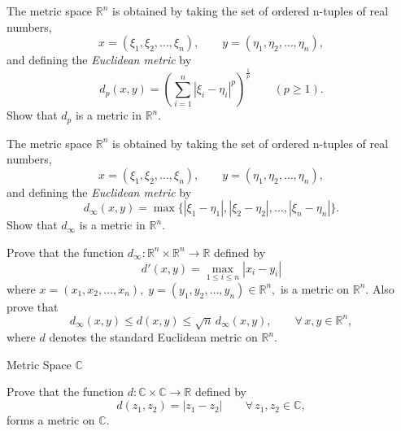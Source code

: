 \documentclass[12pt, a4paper]{article}
\begin{document}
\clearpage

\begin{theorem}
    The metric space $\mathbb{R}^n$ is obtained by taking the set of ordered n-tuples of
    real numbers,
    \[
    x=(\xi_1,\xi_2,\ldots,\xi_n), \qquad y=(\eta_1,\eta_2,\ldots,\eta_n),
    \]
    and defining the \emph{Euclidean metric} by
    \[
    d_p(x,y)=\left(\sum_{i=1}^{n}|\xi_i-\eta_i|^p\right)^{\frac{1}{p}} \qquad (p\ge 1).
    \]
    Show that $d_p$ is a metric in $\mathbb{R}^n$.
\end{theorem}

\clearpage

\begin{theorem}
    The metric space $\mathbb{R}^n$ is obtained by taking the set of ordered n-tuples of
    real numbers,
    \[
    x=(\xi_1,\xi_2,\ldots,\xi_n), \qquad y=(\eta_1,\eta_2,\ldots,\eta_n),
    \]
    and defining the \emph{Euclidean metric} by
    \[
    d_\infty(x,y)=\max\{|\xi_1-\eta_1|,|\xi_2-\eta_2|,\ldots,|\xi_n-\eta_n|\}.
    \]
    Show that $d_{\infty}$ is a metric in $\mathbb{R}^n$.
\end{theorem}

\clearpage

\begin{theorem}
Prove that the function $d_{\infty} : \mathbb{R}^n \times \mathbb{R}^n \to \mathbb{R}$
defined by
\[
d'(x,y)=\max_{1\le i\le n}|x_i-y_i|\]
where
\(x=(x_1,x_2,\dots,x_n),\;
y=(y_1,y_2,\dots,y_n)\in\mathbb{R}^n,
\)
is a metric on $\mathbb{R}^n$. Also prove that
\[
d_{\infty}(x,y)\le d(x,y)\le \sqrt{n}\,d_{\infty}(x,y),
\qquad \forall\, x,y\in\mathbb{R}^n,
\]
where $d$ denotes the standard Euclidean metric on $\mathbb{R}^n$.
\end{theorem}

\clearpage

\begin{heading}
    Metric Space $\mathbb{C}$
\end{heading}

\vspace{10pt}

\begin{theorem}
Prove that the function
\(
d : \mathbb{C} \times \mathbb{C} \to \mathbb{R}
\)
defined by
\[
d(z_1,z_2)=|z_1-z_2|
\qquad \forall\, z_1,z_2\in\mathbb{C},
\]
forms a metric on $\mathbb{C}$.
\end{theorem}

\clearpage
\end{document}
